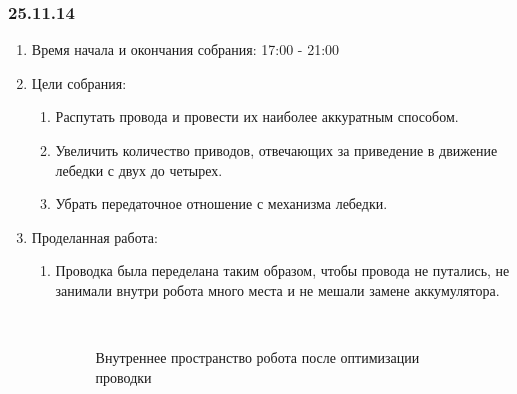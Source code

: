 \subsubsection{25.11.14}

\begin{enumerate}
	\item Время начала и окончания собрания:
	17:00 - 21:00
	\item Цели собрания:
	\begin{enumerate}
		\item Распутать провода и провести их наиболее аккуратным способом.
		
		\item Увеличить количество приводов, отвечающих за приведение в движение лебедки с двух до четырех.
		
		\item Убрать передаточное отношение с механизма лебедки.
		
	\end{enumerate}
	\item Проделанная работа:
	\begin{enumerate}
		\item Проводка была переделана таким образом, чтобы провода не путались, не занимали внутри робота много места и не мешали замене аккумулятора.
		
		\begin{figure}[H]
			\begin{minipage}[h]{0.2\linewidth}
				\center  
			\end{minipage}
			\begin{minipage}[h]{0.6\linewidth}
				\caption{Внутреннее пространство робота после оптимизации проводки}
			\end{minipage}
		\end{figure}
		

\end{enumerate}
\end{enumerate}

